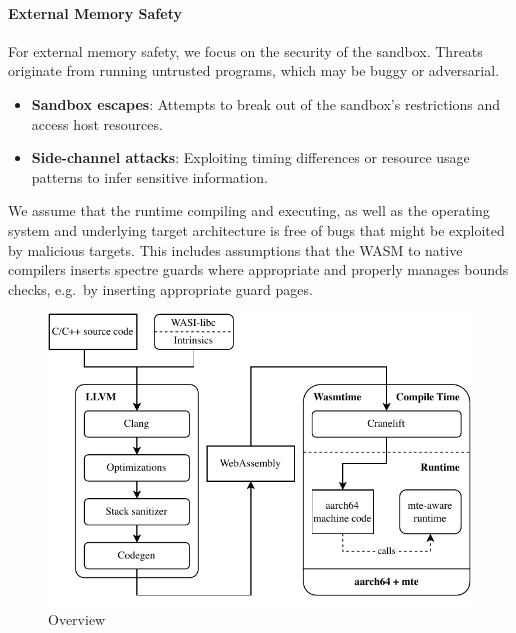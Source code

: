 \paragraph{External Memory Safety}

For external memory safety, we focus on the security of the sandbox.
Threats originate from running untrusted programs, which may be buggy or adversarial.

\begin{itemize}
    \item \textbf{Sandbox escapes}: Attempts to break out of the sandbox's restrictions and access host resources.
    \item \textbf{Side-channel attacks}: Exploiting timing differences or resource usage patterns to infer sensitive information.
\end{itemize}


We assume that the runtime compiling and executing, as well as the operating system and underlying target architecture is free of bugs that might be exploited by malicious targets.
This includes assumptions that the WASM to native compilers inserts spectre guards where appropriate and properly manages bounds checks, e.g.\ by inserting appropriate guard pages.


\begin{figure}[t]
    \centering
    \includegraphics{figures/build/overview}
    \caption{Overview}
    \label{fig:overview}
\end{figure}

